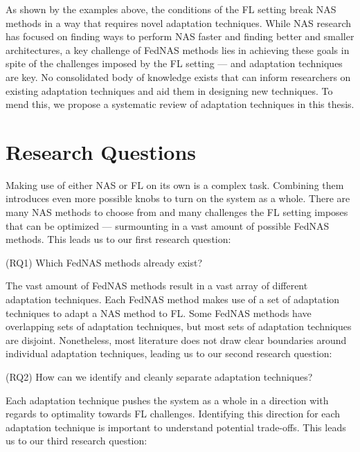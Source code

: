 As shown by the examples above, the conditions of the FL setting break NAS methods in a way that requires novel adaptation techniques. While NAS research has focused on finding ways to perform NAS faster and finding better and smaller architectures, a key challenge of FedNAS methods lies in achieving these goals in spite of the challenges imposed by the FL setting — and adaptation techniques are key. No consolidated body of knowledge exists that can inform researchers on existing adaptation techniques and aid them in designing new techniques. To mend this, we propose a systematic review of adaptation techniques in this thesis. 

\section{Research Questions}


Making use of either NAS or FL on its own is a complex task. Combining them introduces even more possible knobs to turn on the system as a whole. There are many NAS methods to choose from and many challenges the FL setting imposes that can be optimized — surmounting in a vast amount of possible FedNAS methods. This leads us to our first research question:

\vspace{1em}
(RQ1) Which FedNAS methods already exist? 
\vspace{1em}

The vast amount of FedNAS methods result in a vast array of different adaptation techniques. Each FedNAS method makes use of a set of adaptation techniques to adapt a NAS method to FL. Some FedNAS methods have overlapping sets of adaptation techniques, but most sets of adaptation techniques are disjoint. Nonetheless, most literature does not draw clear boundaries around individual adaptation techniques, leading us to our second research question:

\vspace{1em}
(RQ2) How can we identify and cleanly separate adaptation techniques?
\vspace{1em}

Each adaptation technique pushes the system as a whole in a direction with regards to optimality towards FL challenges. Identifying this direction for each adaptation technique is important to understand potential trade-offs. This leads us to our third research question:

